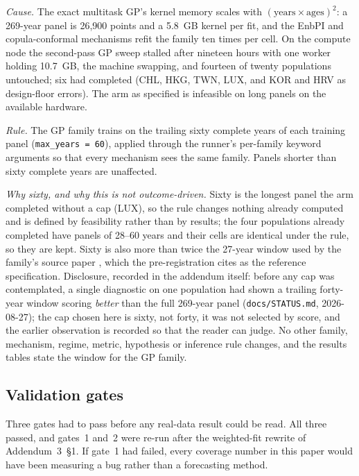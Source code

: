 \emph{Cause.} The exact multitask GP's kernel memory scales with
$(\text{years}\times\text{ages})^2$: a 269-year panel is 26{,}900 points and a
5.8~GB kernel per fit, and the EnbPI and copula-conformal mechanisms refit the
family ten times per cell. On the compute node the second-pass GP sweep
stalled after nineteen hours with one worker holding 10.7~GB, the machine
swapping, and fourteen of twenty populations untouched; six had completed
(CHL, HKG, TWN, LUX, and KOR and HRV as design-floor errors). The arm as
specified is infeasible on long panels on the available hardware.

\emph{Rule.} The GP family trains on the trailing sixty complete years of each
training panel (\texttt{max\_years = 60}), applied through the runner's
per-family keyword arguments so that every mechanism sees the same family.
Panels shorter than sixty complete years are unaffected.

\emph{Why sixty, and why this is not outcome-driven.} Sixty is the longest
panel the arm completed without a cap (LUX), so the rule changes nothing
already computed and is defined by feasibility rather than by results; the
four populations already completed have panels of 28--60 years and their cells
are identical under the rule, so they are kept. Sixty is also more than twice
the 27-year window used by the family's source paper
\citep{huynh2021multi}, which the pre-registration cites as the reference
specification. Disclosure, recorded in the addendum itself: before any cap was
contemplated, a single diagnostic on one population had shown a trailing
forty-year window scoring \emph{better} than the full 269-year panel
(\texttt{docs/STATUS.md}, 2026-08-27); the cap chosen here is sixty, not
forty, it was not selected by score, and the earlier observation is recorded
so that the reader can judge. No other family, mechanism, regime, metric,
hypothesis or inference rule changes, and the results tables state the window
for the GP family.

\subsection{Validation gates}
\label{supp:gates}

Three gates had to pass before any real-data result could be read. All three
passed, and gates~1 and~2 were re-run after the weighted-fit rewrite of
Addendum~3~\S1. If gate~1 had failed, every coverage number in this paper
would have been measuring a bug rather than a forecasting method.


